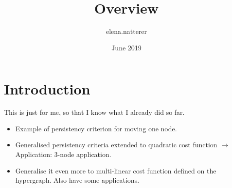 \documentclass{article}
\title{Overview}
\author{elena.natterer }
\date{June 2019}
\begin{document}
\maketitle

\section{Introduction}
This is just for me, so that I know what I already did so far. 
\begin{itemize}
    \item Example of persistency criterion for moving one node.
    \item Generalised persistency criteria extended to quadratic cost function $\rightarrow$ Application: 3-node application.
    \item Generalise it even more to multi-linear cost function defined on the hypergraph. Also have some applications. 
\end{itemize}
\end{document}
